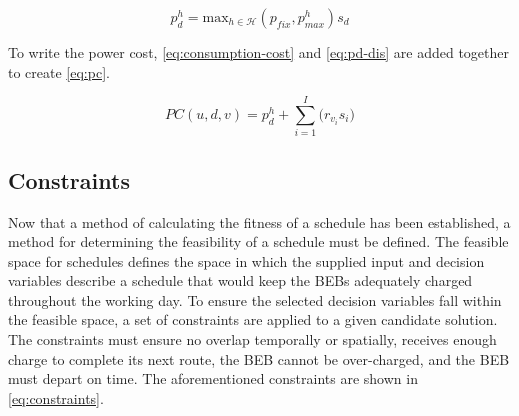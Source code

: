 \documentclass[11pt,a4paper,final]{article}
\newcommand{\PC}{PC(u, d, v)}               %
\newcommand{\Hset}{\mathcal{H}}             %
\begin{document}
\begin{equation}
\label{eq:pd-dis}
  p_d^h = \text{max}_{h \in \Hset}(p_{fix}, p_{max}^h)s_d
\end{equation}

To write the power cost, \ref{eq:consumption-cost} and \ref{eq:pd-dis} are added together to create \ref{eq:pc}.

\begin{equation}
\label{eq:pc}
\PC = p^h_d + \sum_{i=1}^I \Big( r_{v_i}s_i \Big)
\end{equation}

\subsection{Constraints}
\label{sec:constraints}
Now that a method of calculating the fitness of a schedule has been established, a method for determining the
feasibility of a schedule must be defined. The feasible space for schedules defines the space in which the supplied
input and decision variables describe a schedule that would keep the BEBs adequately charged throughout the working day.
To ensure the selected decision variables fall within the feasible space, a set of constraints are applied to a given
candidate solution. The constraints must ensure no overlap temporally or spatially, receives enough charge to complete
its next route, the BEB cannot be over-charged, and the BEB must depart on time. The aforementioned constraints are
shown in \ref{eq:constraints}.
\end{document}
